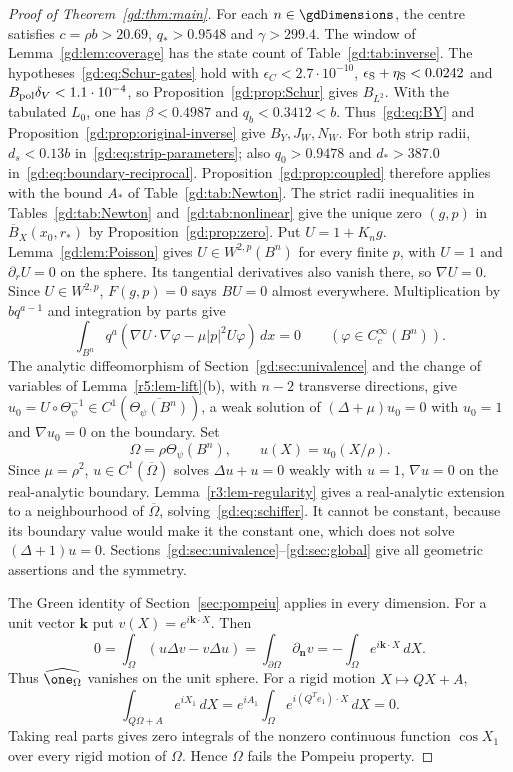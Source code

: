 \begin{proof}[Proof of Theorem~\ref{gd:thm:main}]
For each $n\in\gdDimensions$, the centre satisfies
$c=\rho b>20.69$, $q_*>0.9548$ and $\gamma>299.4$.
The window of Lemma~\ref{gd:lem:coverage} has the state count of
Table~\ref{gd:tab:inverse}. The hypotheses~\eqref{gd:eq:Schur-gates} hold with
$\epsilon_C<2.7\cdot10^{-10}$, $\epsilon_{\rm S}+\eta_{\rm S}<0.0242$
and $B_{\rm pol}\delta_V<1.1\cdot10^{-4}$, so
Proposition~\ref{gd:prop:Schur} gives $B_{L^2}$.
With the tabulated $L_0$, one has $\beta<0.4987$ and
$q_b<0.3412<b$. Thus~\eqref{gd:eq:BY} and
Proposition~\ref{gd:prop:original-inverse} give $B_Y,J_W,N_W$.
For both strip radii, $d_s<0.13b$ in~\eqref{gd:eq:strip-parameters};
also $q_0>0.9478$ and $d_*>387.0$ in~\eqref{gd:eq:boundary-reciprocal}.
Proposition~\ref{gd:prop:coupled} therefore applies with the bound
$A_*$ of Table~\ref{gd:tab:Newton}. The strict radii inequalities
in Tables~\ref{gd:tab:Newton} and~\ref{gd:tab:nonlinear} give the unique
zero $(g,p)$ in $\overline B_X(x_0,r_*)$ by
Proposition~\ref{gd:prop:zero}.
Put $U=1+K_ng$. Lemma~\ref{gd:lem:Poisson} gives $U\in W^{2,p}(B^n)$
for every finite $p$, with $U=1$ and $\partial_rU=0$ on the sphere.
Its tangential derivatives also vanish there, so $\nabla U=0$.
Since $U\in W^{2,p}$, $F(g,p)=0$ says $BU=0$ almost everywhere.
Multiplication by $bq^{a-1}$ and integration by parts give
\[
 \int_{B^n}q^a(\nabla U\cdot\nabla\varphi-\mu|p|^2U\varphi)\,dx=0
 \qquad(\varphi\in C_c^\infty(B^n)).
\]
The analytic diffeomorphism of Section~\ref{gd:sec:univalence} and
the change of variables of Lemma~\ref{r5:lem-lift}(b), with $n-2$
transverse directions, give
$u_0=U\circ\Theta_\psi^{-1}\in C^1(\overline{\Theta_\psi(B^n)})$,
a weak solution of $(\Delta+\mu)u_0=0$ with $u_0=1$ and
$\nabla u_0=0$ on the boundary. Set
\[
 \Omega=\rho\Theta_\psi(B^n),\qquad u(X)=u_0(X/\rho).
\]
Since $\mu=\rho^2$, $u\in C^1(\overline\Omega)$ solves
$\Delta u+u=0$ weakly with $u=1$, $\nabla u=0$ on the real-analytic
boundary. Lemma~\ref{r3:lem-regularity} gives a real-analytic extension
to a neighbourhood of $\overline\Omega$, solving~\eqref{gd:eq:schiffer}.
It cannot be constant, because its boundary value would make it the
constant one, which does not solve $(\Delta+1)u=0$.
Sections~\ref{gd:sec:univalence}--\ref{gd:sec:global} give all geometric
assertions and the symmetry.

The Green identity of Section~\ref{sec:pompeiu}
applies in every dimension. For a unit vector $\mathbf k$ put
$v(X)=e^{i\mathbf k\cdot X}$. Then
\[
 0=\int_\Omega(u\Delta v-v\Delta u)
   =\int_{\partial\Omega}\partial_{\mathbf n} v
   =-\int_\Omega e^{i\mathbf k\cdot X}\,dX .
\]
Thus $\widehat{\one_\Omega}$ vanishes on the unit sphere.
For a rigid motion $X\mapsto QX+A$,
\[
 \int_{Q\Omega+A}e^{iX_1}\,dX
   =e^{iA_1}\int_\Omega e^{i(Q^Te_1)\cdot X}\,dX=0 .
\]
Taking real parts gives zero integrals of the nonzero continuous
function $\cos X_1$ over every rigid motion of $\Omega$.
Hence $\Omega$ fails the Pompeiu property.
\end{proof}
